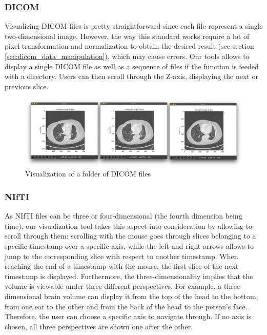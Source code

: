 \subsubsection{DICOM}

Visualizing DICOM files is pretty straightforward since each file represent a single two-dimensional image. However, the way this standard works require a lot of pixel transformation and normalization to obtain the desired result (see section \ref{sec:dicom_data_manipulation}), which may cause errors. Our tools allows to display a single DICOM file as well as a sequence of files if the function is feeded with a directory. Users can then scroll through the Z-axis, displaying the next or previous slice. 

\begin{figure}[!h]
\centering
\includegraphics[width=\textwidth, keepaspectratio=true]{./figures/visualize_lung_dcm.png}
\caption{Visualization of a folder of DICOM files}
\label{fig:visualize_lung_dcm}
\end{figure}


\subsubsection{NIfTI}

As NIfTI files can be three or four-dimensional (the fourth dimension being time), our visualization tool takes this aspect into consideration by allowing to scroll through them: scrolling with the mouse goes through slices belonging to a specific timestamp over a specific axis, while the left and right arrows allows to jump to the corresponding slice with respect to another timestamp. When reaching the end of a timestamp with the mouse, the first slice of the next timestamp is displayed. Furthermore, the three-dimensionality implies that the volume is viewable under three different perspectives. For example, a three-dimensional brain volume can display it from the top of the head to the bottom, from one ear to the other and from the back of the head to the person's face. Therefore, the user can choose a specific axis to navigate through. If no axis is chosen, all three perspectives are shown one after the other.

